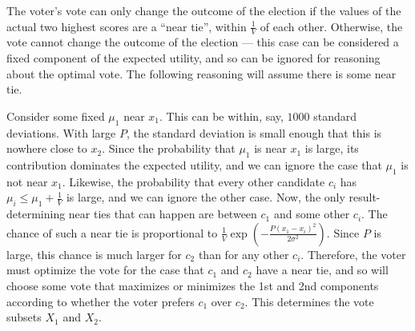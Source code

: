 \documentclass[11pt]{article}
\begin{document}

    The voter's vote can only change the outcome of the election if the
    values of the actual two highest scores are a ``near tie'', within $\frac{1}{V}$ of each other.
    Otherwise, the vote cannot change the outcome of the election
    --- this case can be considered a fixed component of the expected utility,
    and so can be ignored for reasoning about the optimal vote.
    The following reasoning will assume there is some near tie.

    Consider some fixed $\mu_1$ near $x_1$.
    This can be within, say, $1000$ standard deviations.
    With large $P$, the standard deviation is small enough that this is nowhere close to $x_2$.
    Since the probability that $\mu_1$ is near $x_1$ is large,
    its contribution dominates the expected utility,
    and we can ignore the case that $\mu_1$ is not near $x_1$.
    Likewise, the probability that every other candidate $c_i$ has $\mu_i \le \mu_1 + \frac{1}{V}$ is large,
    and we can ignore the other case.
    Now, the only result-determining near ties that can happen are between $c_1$ and some other $c_i$.
    The chance of such a near tie is proportional to $\frac{1}{V} \exp\left(-\frac{P(x_1 - x_i)^2}{2\sigma^2}\right)$.
    Since $P$ is large,
    this chance is much larger for $c_2$ than for any other $c_i$.
    Therefore, the voter must optimize the vote for the case that $c_1$ and $c_2$ have a near tie,
    and so will choose some vote that maximizes or minimizes the 1st and 2nd components according to
    whether the voter prefers $c_1$ over $c_2$.
    This determines the vote subsets $X_1$ and $X_2$.
\end{document}
